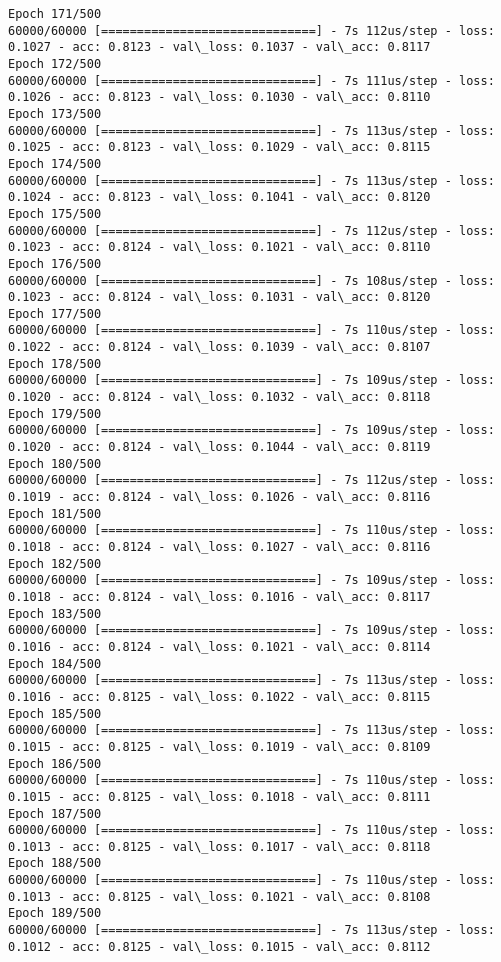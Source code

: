 \documentclass[11pt]{article}
\begin{document}
\begin{Verbatim}[commandchars=\\\{\}]
Epoch 171/500
60000/60000 [==============================] - 7s 112us/step - loss: 0.1027 - acc: 0.8123 - val\_loss: 0.1037 - val\_acc: 0.8117
Epoch 172/500
60000/60000 [==============================] - 7s 111us/step - loss: 0.1026 - acc: 0.8123 - val\_loss: 0.1030 - val\_acc: 0.8110
Epoch 173/500
60000/60000 [==============================] - 7s 113us/step - loss: 0.1025 - acc: 0.8123 - val\_loss: 0.1029 - val\_acc: 0.8115
Epoch 174/500
60000/60000 [==============================] - 7s 113us/step - loss: 0.1024 - acc: 0.8123 - val\_loss: 0.1041 - val\_acc: 0.8120
Epoch 175/500
60000/60000 [==============================] - 7s 112us/step - loss: 0.1023 - acc: 0.8124 - val\_loss: 0.1021 - val\_acc: 0.8110
Epoch 176/500
60000/60000 [==============================] - 7s 108us/step - loss: 0.1023 - acc: 0.8124 - val\_loss: 0.1031 - val\_acc: 0.8120
Epoch 177/500
60000/60000 [==============================] - 7s 110us/step - loss: 0.1022 - acc: 0.8124 - val\_loss: 0.1039 - val\_acc: 0.8107
Epoch 178/500
60000/60000 [==============================] - 7s 109us/step - loss: 0.1020 - acc: 0.8124 - val\_loss: 0.1032 - val\_acc: 0.8118
Epoch 179/500
60000/60000 [==============================] - 7s 109us/step - loss: 0.1020 - acc: 0.8124 - val\_loss: 0.1044 - val\_acc: 0.8119
Epoch 180/500
60000/60000 [==============================] - 7s 112us/step - loss: 0.1019 - acc: 0.8124 - val\_loss: 0.1026 - val\_acc: 0.8116
Epoch 181/500
60000/60000 [==============================] - 7s 110us/step - loss: 0.1018 - acc: 0.8124 - val\_loss: 0.1027 - val\_acc: 0.8116
Epoch 182/500
60000/60000 [==============================] - 7s 109us/step - loss: 0.1018 - acc: 0.8124 - val\_loss: 0.1016 - val\_acc: 0.8117
Epoch 183/500
60000/60000 [==============================] - 7s 109us/step - loss: 0.1016 - acc: 0.8124 - val\_loss: 0.1021 - val\_acc: 0.8114
Epoch 184/500
60000/60000 [==============================] - 7s 113us/step - loss: 0.1016 - acc: 0.8125 - val\_loss: 0.1022 - val\_acc: 0.8115
Epoch 185/500
60000/60000 [==============================] - 7s 113us/step - loss: 0.1015 - acc: 0.8125 - val\_loss: 0.1019 - val\_acc: 0.8109
Epoch 186/500
60000/60000 [==============================] - 7s 110us/step - loss: 0.1015 - acc: 0.8125 - val\_loss: 0.1018 - val\_acc: 0.8111
Epoch 187/500
60000/60000 [==============================] - 7s 110us/step - loss: 0.1013 - acc: 0.8125 - val\_loss: 0.1017 - val\_acc: 0.8118
Epoch 188/500
60000/60000 [==============================] - 7s 110us/step - loss: 0.1013 - acc: 0.8125 - val\_loss: 0.1021 - val\_acc: 0.8108
Epoch 189/500
60000/60000 [==============================] - 7s 113us/step - loss: 0.1012 - acc: 0.8125 - val\_loss: 0.1015 - val\_acc: 0.8112

\end{Verbatim}
\end{document}
